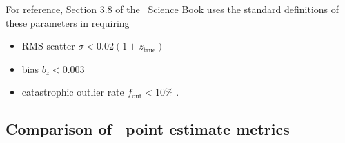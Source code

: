 For reference, Section 3.8 of the \lsst\ Science Book \citep{Abell:09} uses the standard definitions of these parameters in requiring
\begin{itemize}
\item RMS scatter $\sigma < 0.02 (1 + z_{\mathrm{true}})$
\item bias $b_{z} < 0.003$ %
\item catastrophic outlier rate $f_{\mathrm{out}} < 10\%$ %
.
\end{itemize}

\subsection{Comparison of \pz\ point estimate metrics}
\label{sec:pointmetrics_results}

